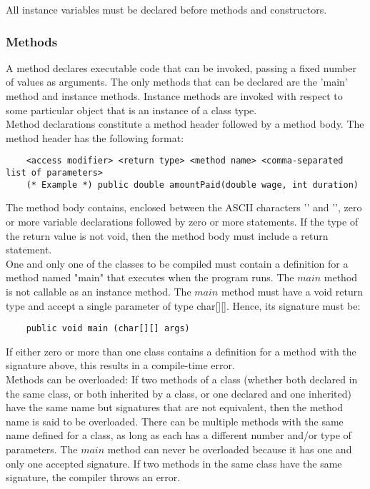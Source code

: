 \begin{homeworkProblem}
	All instance variables must be declared before methods and constructors. 
	
	\subsubsection{Methods}
	A method declares executable code that can be invoked, passing a fixed number of values as arguments. The only methods that can be declared are the 'main' method and instance methods. Instance methods are invoked with respect to some particular object that is an instance of a class type.\\
	
	Method declarations constitute a method header followed by a method body. The method header has the following format:
	\begin{verbatim}
	<access modifier> <return type> <method name> <comma-separated list of parameters>
	(* Example *) public double amountPaid(double wage, int duration)
	\end{verbatim}
	
	The method body contains, enclosed between the ASCII characters '\textbraceleft' and '\textbraceright', zero or more variable declarations followed by zero or more statements. If the type of the return value is not void, then the method body must include a return statement.\\
	
	One and only one of the classes to be compiled must contain a definition for a method named "main" that executes when the program runs. The $main$ method is not callable as an instance method. The $main$ method must have a void return type and accept a single parameter of type char[][]. Hence, its signature must be:
	\begin{verbatim}
	public void main (char[][] args)
	\end{verbatim}
	
	If either zero or more than one class contains a definition for a method with the signature above, this results in a compile-time error.\\
	
	Methods can be overloaded: If two methods of a class (whether both declared in the same class, or both inherited by a class, or one declared and one inherited) have the same name but signatures that are not equivalent, then the method name is said to be overloaded. There can be multiple methods with the same name defined for a class, as long as each has a different number and/or type of parameters. The $main$ method can never be overloaded because it has one and only one accepted signature. If two methods in the same class have the same signature, the compiler throws an error.\\
	

\end{homeworkProblem}
